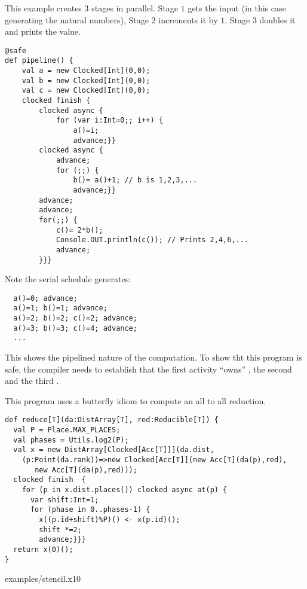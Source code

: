 \begin{example}[Pipeline]
This example creates $3$ stages in parallel. Stage $1$ gets the input
(in this case generating the natural numbers), Stage $2$ increments it
by $1$, Stage $3$ doubles it and prints the value.
\begin{lstlisting}
@safe
def pipeline() {
    val a = new Clocked[Int](0,0);
    val b = new Clocked[Int](0,0);
    val c = new Clocked[Int](0,0);
    clocked finish {
        clocked async {
            for (var i:Int=0;; i++) {
                a()=i;
                advance;}}
        clocked async {
            advance;
            for (;;) {
                b()= a()+1; // b is 1,2,3,...
                advance;}}
        advance;
        advance;
        for(;;) {
            c()= 2*b();
            Console.OUT.println(c()); // Prints 2,4,6,...
            advance;
        }}}
  \end{lstlisting}
Note the serial schedule generates:
\begin{lstlisting}
  a()=0; advance;
  a()=1; b()=1; advance;
  a()=2; b()=2; c()=2; advance;
  a()=3; b()=3; c()=4; advance;
  ...
\end{lstlisting}
\noindent This shows the pipelined nature of the computation. To show
tht this program is safe, the compiler needs to establish that the
first activity ``owns'' , the second  and the third .
\end{example}

\begin{example}
This program uses a butterfly idiom to compute an all to all
reduction.
\begin{lstlisting}
def reduce[T](da:DistArray[T], red:Reducible[T]) {
  val P = Place.MAX_PLACES;
  val phases = Utils.log2(P);
  val x = new DistArray[Clocked[Acc[T]]](da.dist,
    (p:Point(da.rank))=>new Clocked[Acc[T]](new Acc[T](da(p),red),
       new Acc[T](da(p),red)));
  clocked finish  {
    for (p in x.dist.places()) clocked async at(p) {
      var shift:Int=1;
      for (phase in 0..phases-1) {
        x((p.id+shift)%P)() <- x(p.id)();
        shift *=2;
        advance;}}}
  return x(0)();
}
\end{lstlisting}
\end{example}

 {examples/stencil.x10}
